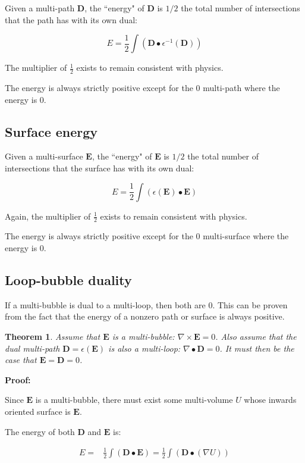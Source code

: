 \documentclass{book}
\newtheorem{thm}{Theorem}
\begin{document}
Given a multi-path \(\mathbf{D}\), the ``energy" of \(\mathbf{D}\) is \(1/2\) the total number of intersections that the path has with its own dual:

\[E = \frac{1}{2}\int (\mathbf{D} \bullet \epsilon^{-1}(\mathbf{D}))\]

The multiplier of \(\frac{1}{2}\) exists to remain consistent with physics.

The energy is always strictly positive except for the \(0\) multi-path where the energy is \(0\).


\subsection{Surface energy}

Given a multi-surface \(\mathbf{E}\), the ``energy" of \(\mathbf{E}\) is \(1/2\) the total number of intersections that the surface has with its own dual:

\[E = \frac{1}{2}\int (\epsilon(\mathbf{E}) \bullet \mathbf{E})\]

Again, the multiplier of \(\frac{1}{2}\) exists to remain consistent with physics.

The energy is always strictly positive except for the \(0\) multi-surface where the energy is \(0\).


\subsection{Loop-bubble duality}


If a multi-bubble is dual to a multi-loop, then both are \(0\). This can be proven from  the fact that the energy of a nonzero path or surface is always positive. 

\begin{thm}
Assume that \(\mathbf{E}\) is a multi-bubble: \(\nabla \times \mathbf{E} = 0\). Also assume that the dual multi-path \(\mathbf{D} = \epsilon(\mathbf{E})\) is also a multi-loop: \(\nabla \bullet \mathbf{D} = 0\). It must then be the case that \(\mathbf{E} = \mathbf{D} = 0\).
\end{thm}
\textbf{Proof:}

Since \(\mathbf{E}\) is a multi-bubble, there must exist some multi-volume \(U\) whose inwards oriented surface is \(\mathbf{E}\). 

The energy of both \(\mathbf{D}\) and \(\mathbf{E}\) is:

\begin{align*}
E = & \frac{1}{2}\int (\mathbf{D} \bullet \mathbf{E}) 
= \frac{1}{2} \int (\mathbf{D} \bullet (\nabla U)) 
\end{align*} 
\end{document}
